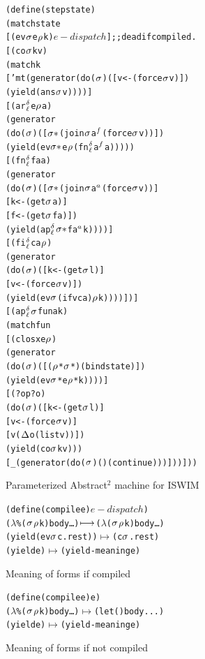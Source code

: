 \documentclass[preprint,onecolumn,9pt]{sigplanconf} %
\begin{document}
\begin{figure}
\begin{alltt}
(define (step state)
  (match state
    [(ev \(\msto\) e \(\menv\) k) \(e-dispatch\)] ;; dead if compiled.
    [(co \(\msto\) k v)
     (match k
       ['mt (generator (do (\(\msto\)) ([v <- (force \(\msto\) v)])
        (yield (ans \(\msto\) v))))]
       [(ar\(\superscript\mcntr\subscript\mlab\) e \(\menv\) a)
        (generator
         (do (\(\msto\)) ([\(\msto*\) (join \(\msto\) a\(\superscript{f}\) (force \(\msto\) v))])
           (yield (ev \(\msto*\) e \(\menv\) (fn\(\superscript\mcntr\subscript\mlab\) a\(\superscript{f}\) a)))))
       [(fn\(\superscript\mcntr\subscript\mlab\) fa a)
        (generator
         (do (\(\msto\)) ([\(\msto*\) (join \(\msto\) a\(\superscript{a}\) (force \(\msto\) v))]
                  [k <- (get \(\msto\) a)]
                  [f <- (get \(\msto\) fa)])
           (yield (ap\(\superscript\mcntr\subscript\mlab\) \(\msto*\) f a\(\superscript{a}\) k))))]
       [(fi\(\superscript\mcntr\subscript\mlab\) c a \(\menv\))
        (generator
         (do (\(\msto\)) ([k <- (get \(\msto\) l)]
                  [v <- (force \(\msto\) v)])
           (yield (ev \(\msto\) (if v c a) \(\menv\) k))))])]
    [(ap\(\superscript\mcntr\subscript\mlab\) \(\msto\) fun a k)
     (match fun
       [(clos x e \(\menv\))
        (generator
         (do (\(\msto\)) ([(\(\menv\)* \(\msto\)*) (bind state)])
           (yield (ev \(\msto\)* e \(\menv\)* k))))]
       [(? op? o)
        (do (\(\msto\)) ([k <- (get \(\msto\) l)]
                 [v <- (force \(\msto\) v)]
                 [v (\(\interpdelta\) o (list v))])
          (yield (co \(\msto\) k v)))
       [_ (generator (do (\(\msto\)) () (continue)))]))]))
\end{alltt}
\caption{Parameterized Abstract$^2$ machine for ISWIM}
\label{fig:paam}
\end{figure}

\begin{figure}
\begin{alltt}
(define (compile e) \(e-dispatch\))
(\(\lambda\)\% (\(\msto\) \(\menv\) k) body \ldots) \(\machstep\) (\(\lambda\) (\(\msto\) \(\menv\) k) body \ldots)
(yield (ev \(\msto\) c . rest)) \(\longmapsto\) (c \(\msto\) . rest)
(yield e) \(\longmapsto\) (yield-meaning e)
\end{alltt}
\caption{Meaning of forms if compiled}
\label{fig:cfm}
\end{figure}

\begin{figure}
\begin{alltt}
(define (compile e) e)
(\(\lambda\)\% (\(\msto\) \(\menv\) k) body \ldots) \(\longmapsto\) (let () body ...)
(yield e) \(\longmapsto\) (yield-meaning e)
\end{alltt}
\caption{Meaning of forms if not compiled}
\label{fig:ncfm}
\end{figure}
\end{document}

